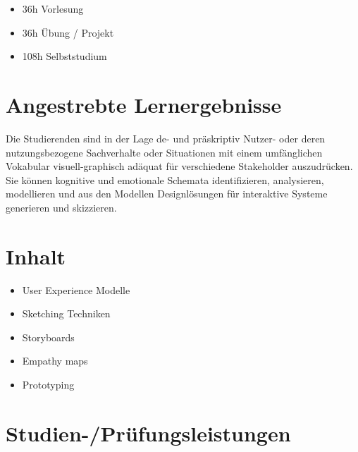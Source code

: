\begin{itemize}
\tightlist
\item
  36h Vorlesung
\item
  36h Übung / Projekt
\item
  108h Selbststudium
\end{itemize}

\section*{Angestrebte
Lernergebnisse\label{/mi-2017/modulbeschreibungen-master/MA_HCI_Sketching_and_Designing_for_User_Experience}}\label{angestrebte-lernergebnissepathlabelmi-2017modulbeschreibungen-mastermaux5fhciux5fsketchingux5fandux5fdesigningux5fforux5fuserux5fexperience}

Die Studierenden sind in der Lage de- und präskriptiv Nutzer- oder deren
nutzungsbezogene Sachverhalte oder Situationen mit einem umfänglichen
Vokabular visuell-graphisch adäquat für verschiedene Stakeholder
auszudrücken. Sie können kognitive und emotionale Schemata
identifizieren, analysieren, modellieren und aus den Modellen
Designlösungen für interaktive Systeme generieren und skizzieren.

\section*{Inhalt\label{/mi-2017/modulbeschreibungen-master/MA_HCI_Sketching_and_Designing_for_User_Experience}}\label{inhaltpathlabelmi-2017modulbeschreibungen-mastermaux5fhciux5fsketchingux5fandux5fdesigningux5fforux5fuserux5fexperience}

\begin{itemize}
\tightlist
\item
  User Experience Modelle
\item
  Sketching Techniken
\item
  Storyboards
\item
  Empathy maps
\item
  Prototyping
\end{itemize}

\section*{Studien-/Prüfungsleistungen\label{/mi-2017/modulbeschreibungen-master/MA_HCI_Sketching_and_Designing_for_User_Experience}}\label{studien-pruxfcfungsleistungenpathlabelmi-2017modulbeschreibungen-mastermaux5fhciux5fsketchingux5fandux5fdesigningux5fforux5fuserux5fexperience}

